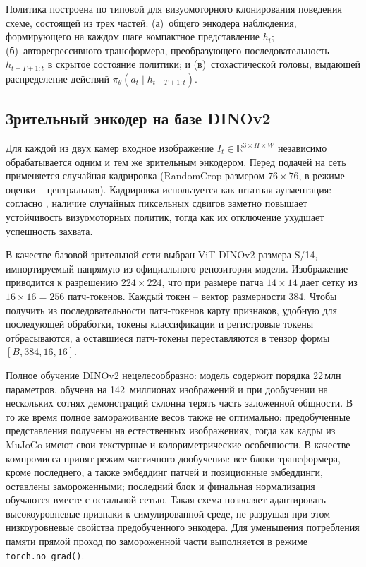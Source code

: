 Политика построена по типовой для визуомоторного клонирования поведения схеме, состоящей из трех частей: (а)~общего энкодера наблюдения, формирующего на каждом шаге компактное представление $h_t$; (б)~авторегрессивного трансформера, преобразующего последовательность $h_{t-T+1:t}$ в скрытое состояние политики; и (в)~стохастической головы, выдающей распределение действий $\pi_\theta(a_t \mid h_{t-T+1:t})$.

\subsection{Зрительный энкодер на базе DINOv2}
\label{subsec:bc-encoder}

Для каждой из двух камер входное изображение $I_t \in \mathbb{R}^{3\times H \times W}$ независимо обрабатывается одним и тем же зрительным энкодером. Перед подачей на сеть применяется случайная кадрировка (RandomCrop размером $76{\times}76$, в режиме оценки -- центральная). Кадрировка используется как штатная аугментация: согласно \cite{mandlekar2021robomimic}, наличие случайных пиксельных сдвигов заметно повышает устойчивость визуомоторных политик, тогда как их отключение ухудшает успешность захвата.

В качестве базовой зрительной сети выбран ViT DINOv2 размера S/14, импортируемый напрямую из официального репозитория модели. Изображение приводится к разрешению $224{\times}224$, что при размере патча $14{\times}14$ дает сетку из $16{\times}16 = 256$ патч-токенов. Каждый токен -- вектор размерности 384. Чтобы получить из последовательности патч-токенов карту признаков, удобную для последующей обработки, токены классификации и регистровые токены отбрасываются, а оставшиеся патч-токены переставляются в тензор формы $[B, 384, 16, 16]$.

Полное обучение DINOv2 нецелесообразно: модель содержит порядка 22\,млн параметров, обучена на 142~миллионах изображений и при дообучении на нескольких сотнях демонстраций склонна терять часть заложенной общности. В то же время полное замораживание весов также не оптимально: предобученные представления получены на естественных изображениях, тогда как кадры из MuJoCo имеют свои текстурные и колориметрические особенности. В качестве компромисса принят режим частичного дообучения: все блоки трансформера, кроме последнего, а также эмбеддинг патчей и позиционные эмбеддинги, оставлены замороженными; последний блок и финальная нормализация обучаются вместе с остальной сетью. Такая схема позволяет адаптировать высокоуровневые признаки к симулированной среде, не разрушая при этом низкоуровневые свойства предобученного энкодера. Для уменьшения потребления памяти прямой проход по замороженной части выполняется в режиме \texttt{torch.no\_grad()}.

